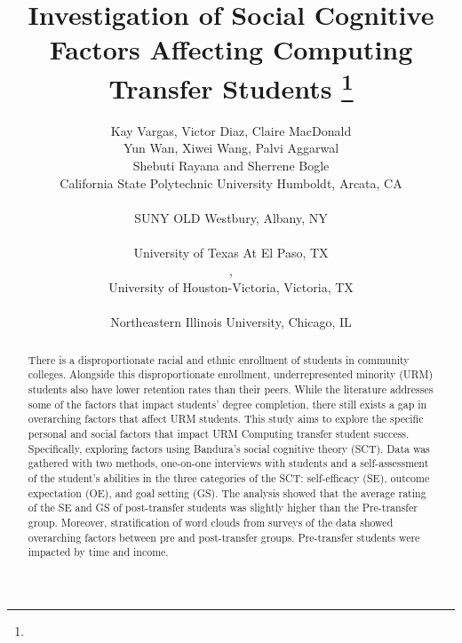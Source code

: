 \documentclass{article}
\title{Investigation of Social Cognitive Factors Affecting Computing Transfer Students
\footnote{\protect}
}
\author{
Kay Vargas\affmark[1],  Victor Diaz\affmark[1],  Claire MacDonald \affmark[3]\\
 Yun Wan\affmark[4], Xiwei Wang\affmark[5], Palvi Aggarwal\affmark[3]\\
 Shebuti Rayana \affmark[2] and Sherrene Bogle \affmark[1]\\
\affmark[1] California State Polytechnic University Humboldt, Arcata, CA\\
\email{\{kv111, vmd21, sab30\}@humboldt.edu}\\
\affmark[2]SUNY OLD Westbury, Albany, NY\\
\email{rayanas@oldwestbury.edu}\\
\affmark[3]University of Texas At El Paso, TX\\
\email{cemacdonald2@miners.utep.edu}, \email{paggarwal@utep.edu}\\
\affmark[4]University of Houston-Victoria, Victoria, TX\\
\email{wany@uhv.edu}\\
\affmark[5]Northeastern Illinois University, Chicago, IL\\
\email{xwang9@neiu.edu}

}
\begin{document}
\maketitle
\thispagestyle{empty}
\pagestyle{empty}

\begin{abstract}
 There is a disproportionate racial and ethnic enrollment of students in community colleges. %
 Alongside this disproportionate enrollment, underrepresented minority (URM) students also have lower retention rates than their peers. While the literature addresses some of the factors that impact students' degree completion, there still exists a gap in overarching factors that affect URM students. This study aims to explore the specific personal and social factors that impact URM Computing transfer student success. Specifically, exploring factors using Bandura's social cognitive theory (SCT). %
Data was gathered with two methods, one-on-one interviews with students and a self-assessment of the student's abilities in the three categories of the SCT: self-efficacy (SE), outcome expectation (OE), and goal setting (GS). The analysis showed that the average rating of the SE and GS of post-transfer students was slightly higher than the Pre-transfer group. Moreover, stratification of word clouds from surveys of the data showed overarching factors between pre and post-transfer groups. Pre-transfer students were impacted by time and income. 
\end{abstract}
\end{document}
